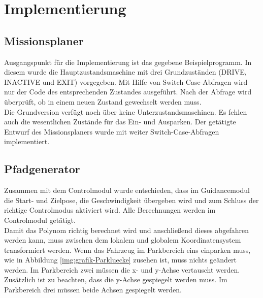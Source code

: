 \chapter{Implementierung}

\section{Missionsplaner}
Ausgangspunkt für die Implementierung ist das gegebene Beispielprogramm. In diesem wurde die Hauptzustandsmaschine mit drei Grundzuständen (DRIVE, INACTIVE und EXIT) vorgegeben. Mit Hilfe von Switch-Case-Abfragen wird nur der Code des entsprechenden Zustandes ausgeführt. Nach der Abfrage wird überprüft, ob in einem neuen Zustand gewechselt werden muss.\\


\noindent Die Grundversion verfügt noch über keine Unterzustandsmaschinen. Es fehlen auch die wesentlichen Zustände für das Ein- und Ausparken. Der getätigte Entwurf des Missionsplaners wurde mit weiter Switch-Case-Abfragen implementiert.

\section{Pfadgenerator}

Zusammen mit dem Controlmodul wurde entschieden, dass im Guidancemodul die Start- und Zielpose, die Geschwindigkeit übergeben wird und zum Schluss der richtige Controlmodus aktiviert wird. Alle Berechnungen werden im Controlmodul getätigt.\\


\noindent Damit das Polynom richtig berechnet wird und anschließend dieses abgefahren werden kann, muss zwischen dem lokalem und globalem Koordinatensystem transformiert werden. Wenn das Fahrzeug im Parkbereich eins einparken muss, wie in Abbildung \ref{img:grafik-Parkluecke} zusehen ist, muss nichts geändert werden. 
Im Parkbereich zwei müssen die x- und y-Achse vertauscht werden. Zusätzlich ist zu beachten, dass die y-Achse gespiegelt werden muss. 
Im Parkbereich drei müssen beide Achsen gespiegelt werden.